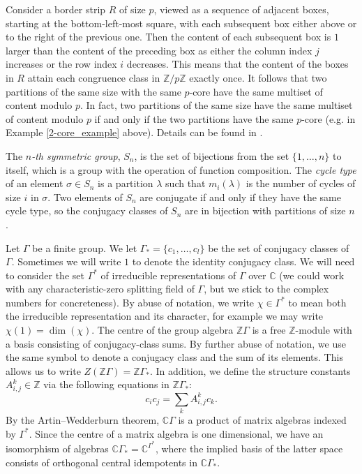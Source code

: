 \documentclass[ALCO,Unicode]{cedram}
\begin{document}
Consider a border strip $R$ of size $p$, viewed as a sequence of adjacent boxes, starting at the bottom-left-most square, with each subsequent box either above or to the right of the previous one. Then the content of each subsequent box is $1$ larger than the content of the preceding box as either the column index $j$ increases or the row index $i$ decreases. This means that the content of the boxes in $R$ attain each congruence class in $\mathbb{Z}/p\mathbb{Z}$ exactly once. It follows that two partitions of the same size with the same $p$-core have the same multiset of content modulo $p$. In fact, two partitions of the same size have the same multiset of content modulo $p$ if and only if the two partitions have the same $p$-core (e.g. in Example \ref{2-core_example} above). Details can be found in \cite[Examples 8 and 11, Section 1.1]{Macdonald}.

The \emph{$n$-th symmetric group}, $S_n$, is the set of bijections from the set $\{1, \ldots, n\}$ to itself, which is a group with the operation of function composition. The \emph{cycle type} of an element $\sigma \in S_n$ is a partition $\lambda$ such that $m_i(\lambda)$ is the number of cycles of size $i$ in $\sigma$. Two elements of $S_n$ are conjugate if and only if they have the same cycle type, so the conjugacy classes of $S_n$ are in bijection with partitions of size $n$.

Let $\Gamma$ be a finite group. We let $\Gamma_* = \{c_1, \ldots, c_l\}$ be the set of conjugacy classes of $\Gamma$. Sometimes we will write $1$ to denote the identity conjugacy class. We will need to consider the set $\Gamma^*$ of irreducible representations of $\Gamma$ over $\mathbb{C}$ (we could work with any characteristic-zero splitting field of $\Gamma$, but we stick to the complex numbers for concreteness). By abuse of notation, we write $\chi \in \Gamma^*$ to mean both the irreducible representation and its character, for example we may write $\chi(1) = \dim(\chi)$. The centre of the group algebra $\mathbb{Z}\Gamma$ is a free $\mathbb{Z}$-module with a basis consisting of conjugacy-class sums. By further abuse of notation, we use the same symbol to denote a conjugacy class and the sum of its elements. This allows us to write $Z(\mathbb{Z}\Gamma) = \mathbb{Z}\Gamma_*$. In addition, we define the structure constants $A_{i,j}^k \in \mathbb{Z}$ via the following equations in $\mathbb{Z}\Gamma_*$:
\begin{equation} \label{gp_alg_centre_str_consts}
c_i c_j = \sum_k A_{i,j}^k c_k.
\end{equation}
By the Artin--Wedderburn theorem, $\mathbb{C}\Gamma$ is a product of matrix algebras indexed by $\Gamma^*$. Since the centre of a matrix algebra is one dimensional, we have an isomorphism of algebras $\mathbb{C}\Gamma_* = \mathbb{C}^{\Gamma^*}$, where the implied basis of the latter space consists of orthogonal central idempotents in $\mathbb{C}\Gamma_*$.
\end{document}
